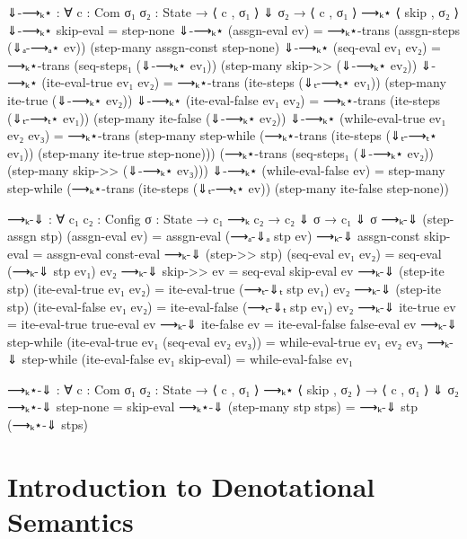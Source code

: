 \documentclass{lecturenotes}
\begin{document}
\begin{code}[hide]
⇓-⟶ₖ⋆ : ∀ {c : Com} {σ₁ σ₂ : State} → ⟨ c , σ₁ ⟩ ⇓ σ₂ → ⟨ c , σ₁ ⟩ ⟶ₖ⋆ ⟨ skip , σ₂ ⟩
⇓-⟶ₖ⋆ skip-eval = step-none
⇓-⟶ₖ⋆ (assgn-eval ev) = ⟶ₖ⋆-trans (assgn-steps (⇓ₐ-⟶ₐ⋆ ev)) (step-many assgn-const step-none)
⇓-⟶ₖ⋆ (seq-eval ev₁ ev₂) = ⟶ₖ⋆-trans (seq-steps₁ (⇓-⟶ₖ⋆ ev₁)) (step-many skip->> (⇓-⟶ₖ⋆ ev₂))
⇓-⟶ₖ⋆ (ite-eval-true ev₁ ev₂) = ⟶ₖ⋆-trans (ite-steps (⇓ₜ-⟶ₜ⋆ ev₁)) (step-many ite-true (⇓-⟶ₖ⋆ ev₂))
⇓-⟶ₖ⋆ (ite-eval-false ev₁ ev₂) = ⟶ₖ⋆-trans (ite-steps (⇓ₜ-⟶ₜ⋆ ev₁)) (step-many ite-false (⇓-⟶ₖ⋆ ev₂))
⇓-⟶ₖ⋆ (while-eval-true ev₁ ev₂ ev₃) = ⟶ₖ⋆-trans (step-many step-while (⟶ₖ⋆-trans (ite-steps (⇓ₜ-⟶ₜ⋆ ev₁)) (step-many ite-true step-none))) (⟶ₖ⋆-trans (seq-steps₁ (⇓-⟶ₖ⋆ ev₂)) (step-many skip->> (⇓-⟶ₖ⋆ ev₃)))
⇓-⟶ₖ⋆ (while-eval-false ev) = step-many step-while (⟶ₖ⋆-trans (ite-steps (⇓ₜ-⟶ₜ⋆ ev)) (step-many ite-false step-none))

⟶ₖ-⇓ : ∀ {c₁ c₂ : Config} {σ : State} → c₁ ⟶ₖ c₂ → c₂ ⇓ σ → c₁ ⇓ σ
⟶ₖ-⇓ (step-assgn stp) (assgn-eval ev) = assgn-eval (⟶ₐ-⇓ₐ stp ev)
⟶ₖ-⇓ assgn-const skip-eval = assgn-eval const-eval
⟶ₖ-⇓ (step->> stp) (seq-eval ev₁ ev₂) = seq-eval (⟶ₖ-⇓ stp ev₁) ev₂
⟶ₖ-⇓ skip->> ev = seq-eval skip-eval ev
⟶ₖ-⇓ (step-ite stp) (ite-eval-true ev₁ ev₂) = ite-eval-true (⟶ₜ-⇓ₜ stp ev₁) ev₂
⟶ₖ-⇓ (step-ite stp) (ite-eval-false ev₁ ev₂) = ite-eval-false (⟶ₜ-⇓ₜ stp ev₁) ev₂
⟶ₖ-⇓ ite-true ev = ite-eval-true true-eval ev
⟶ₖ-⇓ ite-false ev = ite-eval-false false-eval ev
⟶ₖ-⇓ step-while (ite-eval-true ev₁ (seq-eval ev₂ ev₃)) = while-eval-true ev₁ ev₂ ev₃
⟶ₖ-⇓ step-while (ite-eval-false ev₁ skip-eval) = while-eval-false ev₁

⟶ₖ⋆-⇓ : ∀ {c : Com} {σ₁ σ₂ : State} → ⟨ c , σ₁ ⟩ ⟶ₖ⋆ ⟨ skip , σ₂ ⟩ → ⟨ c , σ₁ ⟩ ⇓ σ₂
⟶ₖ⋆-⇓ step-none = skip-eval
⟶ₖ⋆-⇓ (step-many stp stps) = ⟶ₖ-⇓ stp (⟶ₖ⋆-⇓ stps)
\end{code}

\section{Introduction to Denotational Semantics}
\label{sec:intr-denot-semant}
\end{document}
